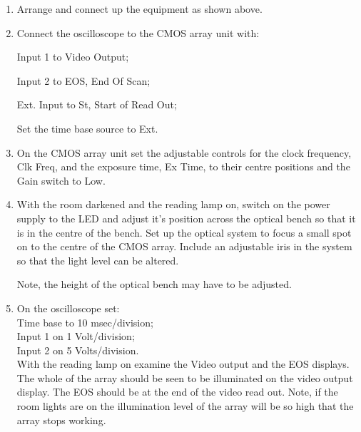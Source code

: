 \begin{enumerate}
	\item Arrange and connect up the equipment as shown above.
	\item  Connect the oscilloscope to the CMOS array unit with:
	
			Input 1 to Video Output;

			Input 2 to EOS, End Of Scan;

			Ext. Input to St, Start of Read Out;
			
			Set the time base source to Ext.
	\item On the CMOS array unit set the adjustable controls for the clock frequency, Clk Freq, and the exposure time, Ex Time, to their centre positions and the Gain switch to Low.
	\item With the room darkened and the reading lamp on, switch on the power supply to the LED
and adjust it’s position across the optical bench so that it is in the centre of the bench. Set
up the optical system to focus a small spot on to the centre of the CMOS array. Include an
adjustable iris in the system so that the light level can be altered.

Note, the height of the optical bench may have to be adjusted.
	\item On the oscilloscope set: \\
Time base to 10 msec/division;\\
Input 1 on 1 Volt/division;\\
Input 2 on 5 Volts/division.\\
With the reading lamp on examine the Video output and the EOS displays.
The whole of the array should be seen to be illuminated on the video output display. The
EOS should be at the end of the video read out.
Note, if the room lights are on the illumination level of the array will be so high that the
array stops working.
\end{enumerate}



